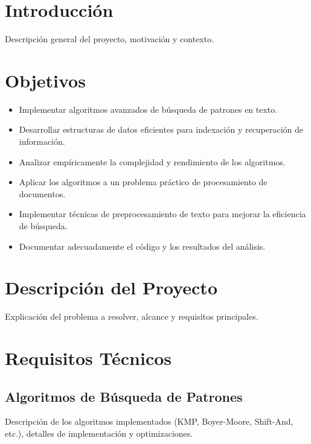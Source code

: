 \documentclass[9pt,letterpaper,onecolumn]{rho-class/rho}
\title{}
\author[$\dagger$]{Diego Sanhueza}
\author[$\dagger$]{Manuel González}
\author[$\dagger$]{Claudio Matulich}
\affil[$\dagger$]{Universidad de Magallanes}
\begin{document}
\maketitle
\thispagestyle{firststyle}
\tableofcontents


\section{Introducción}
Descripción general del proyecto, motivación y contexto.

\section{Objetivos}
\begin{itemize}
    \item Implementar algoritmos avanzados de búsqueda de patrones en texto.
    \item Desarrollar estructuras de datos eficientes para indexación y recuperación de información.
    \item Analizar empíricamente la complejidad y rendimiento de los algoritmos.
    \item Aplicar los algoritmos a un problema práctico de procesamiento de documentos.
    \item Implementar técnicas de preprocesamiento de texto para mejorar la eficiencia de búsqueda.
    \item Documentar adecuadamente el código y los resultados del análisis.
\end{itemize}

\section{Descripción del Proyecto}
Explicación del problema a resolver, alcance y requisitos principales.

\section{Requisitos Técnicos}
\subsection{Algoritmos de Búsqueda de Patrones}
Descripción de los algoritmos implementados (KMP, Boyer-Moore, Shift-And, etc.), detalles de implementación y optimizaciones.
\end{document}
